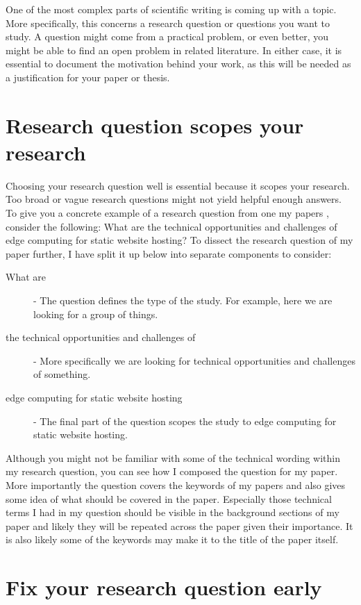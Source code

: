One of the most complex parts of scientific writing is coming up with a topic.
More specifically, this concerns a research question or questions you want to study.
A question might come from a practical problem, or even better, you might be able to find an open problem in related literature.
In either case, it is essential to document the motivation behind your work, as this will be needed as a justification for your paper or thesis.

\section{Research question scopes your research}

Choosing your research question well is essential because it scopes your research.
Too broad or vague research questions might not yield helpful enough answers.
To give you a concrete example of a research question from one my papers \citep{vepsalainen2023implications}, consider the following: What are the technical opportunities and challenges of edge computing for static website hosting? To dissect the research question of my paper further, I have split it up below into separate components to consider:

\begin{description}
    \item[What are] - The question defines the type of the study. For example, here we are looking for a group of things.
    \item[the technical opportunities and challenges of] - More specifically we are looking for technical opportunities and challenges of something.
    \item[edge computing for static website hosting] - The final part of the question scopes the study to edge computing for static website hosting.
\end{description}

Although you might not be familiar with some of the technical wording within my research question, you can see how I composed the question for my paper.
More importantly the question covers the keywords of my papers and also gives some idea of what should be covered in the paper.
Especially those technical terms I had in my question should be visible in the background sections of my paper and likely they will be repeated across the paper given their importance.
It is also likely some of the keywords may make it to the title of the paper itself.

\section{Fix your research question early}

